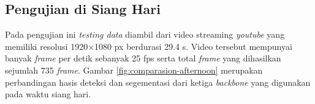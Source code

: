 \begin{table}[!h]
	\label{tab:video-morning}
\end{table}

\subsection{Pengujian di Siang Hari}
\label{subsec:siang}

Pada pengujian ini \textit{testing data} diambil dari video streaming \textit{youtube}\citep{test-siang} yang memiliki resolusi 1920$\times$1080 px berdurasi 29.4 s. Video tersebut mempunyai banyak \textit{frame} per detik sebanyak 25 fps serta total \textit{frame} yang dihasilkan sejumlah 735 \textit{frame}. Gambar \ref{fig:comparasion-afternoon} merupakan perbandingan hasis deteksi dan segementasi dari ketiga \textit{backbone} yang digunakan pada waktu siang hari.

